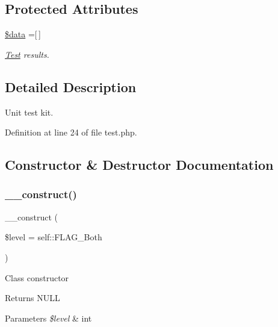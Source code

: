 \subsection*{Protected Attributes}
\begin{DoxyCompactItemize}
\item 
\hypertarget{class_test_a6efc15b5a2314dd4b5aaa556a375c6d6}{}\label{class_test_a6efc15b5a2314dd4b5aaa556a375c6d6} 
\hyperlink{class_test_a6efc15b5a2314dd4b5aaa556a375c6d6}{\$data} =\mbox{[}$\,$\mbox{]}
\begin{DoxyCompactList}\small\item\em \hyperlink{class_test}{Test} results. \end{DoxyCompactList}\end{DoxyCompactItemize}


\subsection{Detailed Description}
Unit test kit. 

Definition at line 24 of file test.\+php.



\subsection{Constructor \& Destructor Documentation}
\hypertarget{class_test_a54d3be59961cf484bfd4cb83ddabab74}{}\label{class_test_a54d3be59961cf484bfd4cb83ddabab74} 
\subsubsection{\texorpdfstring{\+\_\+\+\_\+construct()}{\_\_construct()}}
{\footnotesize\ttfamily \+\_\+\+\_\+construct (\begin{DoxyParamCaption}\item[{}]{\$level = {\ttfamily self\+:\+:FLAG\+\_\+Both} }\end{DoxyParamCaption})}

Class constructor \begin{DoxyReturn}{Returns}
N\+U\+LL 
\end{DoxyReturn}

\begin{DoxyParams}{Parameters}
{\em \$level} & int \\
\hline
\end{DoxyParams}



